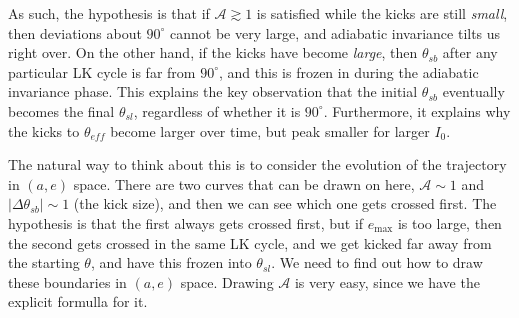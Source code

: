\documentclass[11pt,
        usenames, %
        dvipsnames %
    ]{article}
\newcommand*{\abs}[1]{\left|#1\right|}
\begin{document}
As such, the hypothesis is that if $\mathcal{A} \gtrsim 1$ is satisfied while
the kicks are still \emph{small}, then deviations about $90^\circ$ cannot be
very large, and adiabatic invariance tilts us right over. On the other hand, if
the kicks have become \emph{large}, then $\theta_{sb}$ after any particular LK
cycle is far from $90^\circ$, and this is frozen in during the adiabatic
invariance phase. This explains the key observation that the initial
$\theta_{sb}$ eventually becomes the final $\theta_{sl}$, regardless of whether
it is $90^\circ$. Furthermore, it explains why the kicks to $\theta_{eff}$
become larger over time, but peak smaller for larger $I_0$.

The natural way to think about this is to consider the evolution of the
trajectory in $(a, e)$ space. There are two curves that can be drawn on here,
$\mathcal{A} \sim 1$ and $\abs{\Delta \theta_{sb}} \sim 1$ (the kick size), and
then we can see which one gets crossed first. The hypothesis is that the first
always gets crossed first, but if $e_{\max}$ is too large, then the second gets
crossed in the same LK cycle, and we get kicked far away from the starting
$\theta$, and have this frozen into $\theta_{sl}$. We need to find out how to
draw these boundaries in $(a, e)$ space. Drawing $\mathcal{A}$ is very easy,
since we have the explicit formulla for it.
\end{document}
